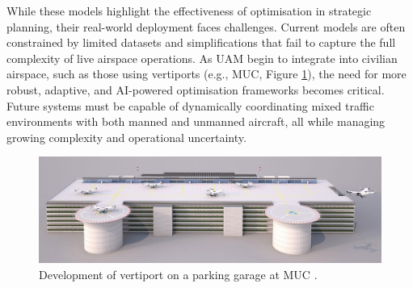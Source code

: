 While these models highlight the effectiveness of optimisation in strategic planning, their real-world deployment faces challenges.
Current models are often constrained by limited datasets and simplifications that fail to capture the full complexity of live airspace operations.
As \gls{UAM} begin to integrate into civilian airspace, such as those using vertiports (e.g., \gls{MUC}, Figure \ref{vertiport}), the need for more robust, adaptive, and \gls{AI}-powered optimisation frameworks becomes critical.
Future systems must be capable of dynamically coordinating mixed traffic environments with both manned and unmanned aircraft, all while managing growing complexity and operational uncertainty.

\begin{figure}[!ht]
    \centering
    \includegraphics[width=.6\textwidth]{img/vertiport.jpeg}
    \caption{Development of vertiport on a parking garage at MUC \cite{amd_vertiport}.}
    \label{vertiport}
\end{figure}